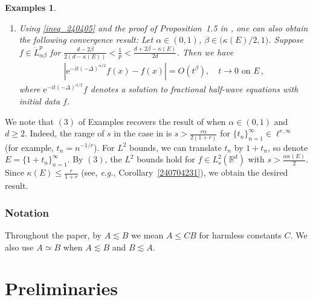 \documentclass[11pt]{amsart}
\theoremstyle{plain}
\newtheorem*{example}{Examples}
\theoremstyle{definition}
\theoremstyle{remark}
\numberwithin{equation}{section}
\newcommand{\bR}{\mathbb{R}}
\begin{document}
\begin{example}
\begin{enumerate}
    \item Using \eqref{ineq_240405} and the proof of Proposition~1.5 in \cite{LeeSeo_2023}, one can also obtain the following convergence result: 
    Let $\alpha\in(0,1)$, $\beta\in\big(\kappa(E)/2,1\big)$. 
    Suppose $f\in \dot{L}_{\alpha\beta}^p$ for $\frac{d-2\beta}{2(d-\kappa(E))}<\frac{1}{p}<\frac{d+2\beta-\kappa(E)}{2d}$.
    Then we have
    \begin{align*}
        \left|\mathrm{e}^{-it(-\Delta)^{\alpha/2}}f(x) - f(x)\right|=O(t^\beta),\quad t\to 0\text{ on }E\,,
    \end{align*}
    where $\mathrm{e}^{-it(-\Delta)^{\alpha/2}}f$ denotes a solution to fractional half-wave equations with initial data $f$.
\end{enumerate}
\end{example}
We note that $(3)$ of Examples recovers the result of \cite[Remark 1.3]{CKKL2023} when $\alpha\in(0,1)$ and $d\geq2$.
Indeed, the range of $s$ in the case in \cite[Remark 1.3]{CKKL2023} is $s>\frac{r\alpha}{2(1+r)}$ for $\{t_n\}_{n=1}^\infty\in \ell^{r,\infty}$ (for example, $t_n = n^{-1/r}$).
For $L^2$ bounds, we can translate $t_n$ by $1+t_n$, so denote $E=\{1+t_n\}_{n=1}^\infty$. 
By $(3)$, the $L^2$ bounds hold for $f\in L_s^2(\bR^d)$ with $s>\frac{\alpha \kappa(E)}{2}$.
Since $\kappa(E)\leq\frac{r}{1+r}$ (see, \textit{e.g.}, Corollary~\ref{240704231}), we obtain the desired result. 



\subsubsection*{Notation}  Throughout the paper, by $A \lesssim B$ we mean $A \le CB$ for harmless constants $C$. We also use $A \simeq B$ when $A\lesssim B$ and $B\lesssim A$.



\section{Preliminaries}\label{preliminaries}
\end{document}
